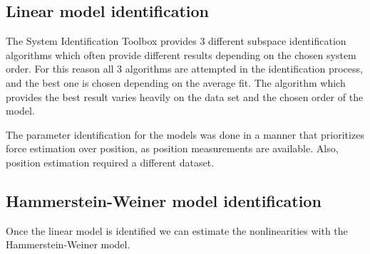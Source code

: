 \subsection{Linear model identification}

The System Identification Toolbox provides 3 different subspace identification algorithms which often provide different results depending on the chosen system order. 
For this reason all 3 algorithms are attempted in the identification process, and the best one is chosen depending on the average fit.
The algorithm which provides the best result varies heavily on the data set and the chosen order of the model.

%
%

The parameter identification for the models was done in a manner that prioritizes force estimation over position, as position measurements are available.
Also, position estimation required a different dataset.


\subsection{Hammerstein-Weiner model identification}

Once the linear model is identified we can estimate the nonlinearities with the Hammerstein-Weiner model.
